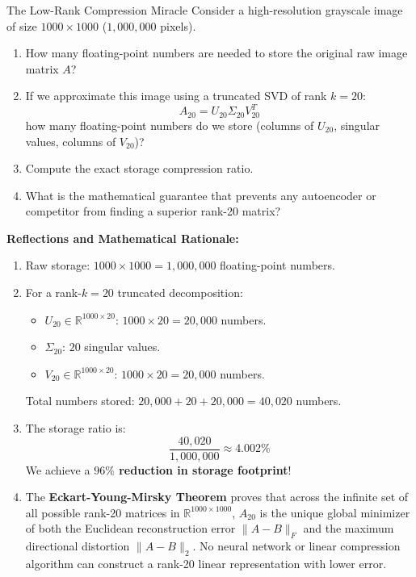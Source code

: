 \begin{ponderbox}{The Low-Rank Compression Miracle}
Consider a high-resolution grayscale image of size $1000 \times 1000$ ($1{,}000{,}000$ pixels).
\begin{enumerate}
    \item How many floating-point numbers are needed to store the original raw image matrix $A$?
    \item If we approximate this image using a truncated SVD of rank $k = 20$:
    \begin{equation*}
    A_{20} = U_{20} \Sigma_{20} V_{20}^T
    \end{equation*}
    how many floating-point numbers do we store (columns of $U_{20}$, singular values, columns of $V_{20}$)?
    \item Compute the exact storage compression ratio.
    \item What is the mathematical guarantee that prevents any autoencoder or competitor from finding a superior rank-20 matrix?
\end{enumerate}
\tcblower
\textbf{Reflections and Mathematical Rationale:}
\begin{enumerate}
    \item Raw storage: $1000 \times 1000 = 1{,}000{,}000$ floating-point numbers.
    \item For a rank-$k=20$ truncated decomposition:
    \begin{itemize}
        \item $U_{20} \in \mathbb{R}^{1000 \times 20}$: $1000 \times 20 = 20{,}000$ numbers.
        \item $\Sigma_{20}$: $20$ singular values.
        \item $V_{20} \in \mathbb{R}^{1000 \times 20}$: $1000 \times 20 = 20{,}000$ numbers.
    \end{itemize}
    Total numbers stored: $20{,}000 + 20 + 20{,}000 = 40{,}020$ numbers.
    \item The storage ratio is:
    \begin{equation*}
    \frac{40{,}020}{1{,}000{,}000} \approx 4.002\%
    \end{equation*}
    We achieve a \textbf{$96\%$ reduction in storage footprint}!
    \item The \textbf{Eckart-Young-Mirsky Theorem} proves that across the infinite set of all possible rank-20 matrices in $\mathbb{R}^{1000 \times 1000}$, $A_{20}$ is the unique global minimizer of both the Euclidean reconstruction error $\|A - B\|_F$ and the maximum directional distortion $\|A - B\|_2$. No neural network or linear compression algorithm can construct a rank-20 linear representation with lower error.
\end{enumerate}
\end{ponderbox}

